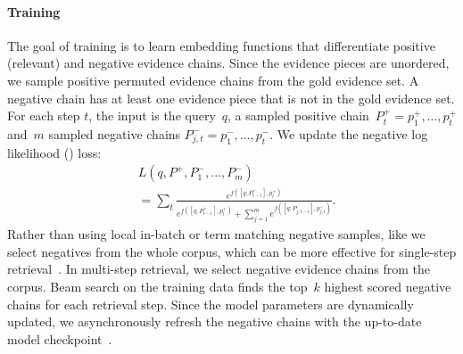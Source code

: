\paragraph{Training \name{}}

The goal of training is to learn embedding functions that
differentiate positive (relevant) and negative evidence chains.
%
Since the evidence pieces are unordered, we 
sample positive permuted evidence chains from the gold evidence set.
%
A negative chain has at least one evidence piece that is not in the gold 
evidence set. 
For each step $t$, the input is
the query~$q$, a sampled positive chain~$P_{t}^{+} = p^{+}_{1},\dots,p^{+}_{t}$
and~$m$ sampled negative chains $P_{j, t}^{-} = p^{-}_{1},\dots,p^{-}_{t}$. 
We update the negative log likelihood () loss:
\begin{align}
  &L(q, P^{+}, P_{1}^{-}, ..., P_{m}^{-})   \\
  &=\sum_{t}{\frac{e^{f([q;P_{t-1}^{+}], p^{+}_{t})}}{e^{f([q;P_{t-1}^{+}], p^{+}_{t})} + \sum_{j=1}^{m} {e^{f([q;P_{j, t-1}], p^{-}_{j, t})}}}}.\nonumber
  \label{eqn:loss}
\end{align}
Rather than using local in-batch or term matching negative samples,
like \citet{guu2020realm} we select negatives from the whole corpus,
which can be more effective for single-step
retrieval~\cite{xiong2020approximate}.
%
In multi-step retrieval, we select negative evidence chains from the corpus.
Beam search on the training data finds the top~$k$
highest scored negative chains for each retrieval step. Since the model parameters are dynamically updated, 
we asynchronously refresh the negative chains with 
the up-to-date model checkpoint~\cite{guu2020realm, xiong2020approximate}. 


